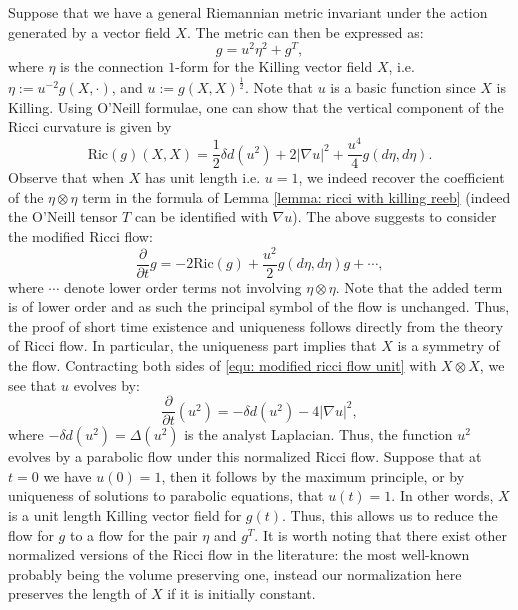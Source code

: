\documentclass{article}
\theoremstyle{definition}
\numberwithin{equation}{section}
\begin{document}
Suppose that we have a general  Riemannian metric invariant under the action generated by a vector field $X$. The metric can then be expressed as:
\[
g=u^2\eta^2+g^T,
\]
where $\eta$ is the connection $1$-form for the Killing vector field $X$, i.e. $\eta:=u^{-2}g(X,\cdot)$, and $u:=g(X,X)^{\frac{1}{2}}$. Note that $u$ is a basic function since $X$ is Killing. Using O'Neill formulae, one can show that the vertical component of the Ricci curvature is given by
\begin{equation*}
\mathrm{Ric}(g)(X,X)=\frac{1}{2}\delta d(u^2)+2|\nabla u|^2+\frac{u^4}{4}g(d\eta,d\eta).
\end{equation*}
Observe that when $X$ has unit length i.e. $u=1$, we indeed recover the coefficient of the $\eta\otimes\eta$ term in the formula of Lemma \ref{lemma: ricci with killing reeb} (indeed the O'Neill tensor $T$ can be identified with $\nabla u$). The above suggests to consider the modified Ricci flow:
\begin{equation}\label{equ: modified ricci flow unit}
\frac{\partial}{\partial t} g= -2\mathrm{Ric}(g)+\frac{u^2}{2}g(d\eta,d\eta) g + \cdots,
\end{equation}
where $\cdots$ denote lower order terms not involving $\eta\otimes\eta$. Note that the added term is of lower order and as such the principal symbol of the flow is unchanged. Thus, the proof of short time existence and uniqueness follows directly from the theory of Ricci flow. In particular, the uniqueness part implies that $X$ is a symmetry of the flow.
Contracting both sides of \eqref{equ: modified ricci flow unit} with $X\otimes X$, we see that $u$ evolves by:
\[
\frac{\partial}{\partial t} (u^2)= -\delta d(u^2)-4|\nabla u|^2,
\]
where $-\delta d(u^2)=\Delta(u^2)$ is the analyst Laplacian. 
Thus, the function $u^2$ evolves by a  parabolic flow under this normalized Ricci flow. Suppose that at $t=0$ we have $u(0)=1$, then it follows by the maximum principle, or by uniqueness of solutions to parabolic equations, that $u(t)=1$. In other words, $X$ is a unit length Killing vector field for $g(t)$. Thus, this allows us to reduce the flow for $g$ to a flow for the pair $\eta$ and $g^T$.
It is worth noting that there exist other normalized versions of the Ricci flow in the literature: the most well-known probably being the volume preserving one, instead our normalization here preserves the length of $X$ if it is initially constant.
\end{document}
